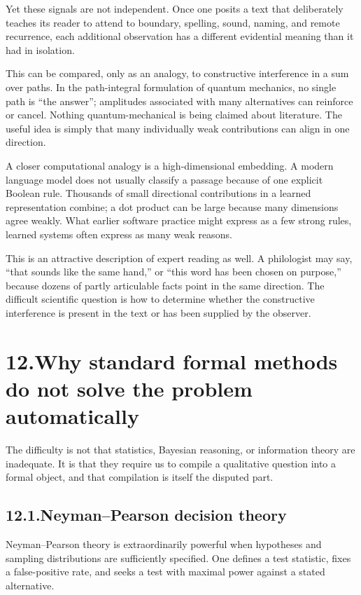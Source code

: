 Yet these signals are not independent.  Once one posits a text that deliberately teaches its reader to attend to boundary, spelling, sound, naming, and remote recurrence, each additional observation has a different evidential meaning than it had in isolation.

This can be compared, only as an analogy, to constructive interference in a sum over paths.  In the path-integral formulation of quantum mechanics, no single path is ``the answer''; amplitudes associated with many alternatives can reinforce or cancel.\cite{FeynmanHibbs1965}  Nothing quantum-mechanical is being claimed about literature.  The useful idea is simply that many individually weak contributions can align in one direction.

A closer computational analogy is a high-dimensional embedding.  A modern language model does not usually classify a passage because of one explicit Boolean rule.  Thousands of small directional contributions in a learned representation combine; a dot product can be large because many dimensions agree weakly.  What earlier software practice might express as a few strong rules, learned systems often express as many weak reasons.

This is an attractive description of expert reading as well.  A philologist may say, ``that sounds like the same hand,'' or ``this word has been chosen on purpose,'' because dozens of partly articulable facts point in the same direction.  The difficult scientific question is how to determine whether the constructive interference is present in the text or has been supplied by the observer.

\section*{12.\quad Why standard formal methods do not solve the problem automatically}

The difficulty is not that statistics, Bayesian reasoning, or information theory are inadequate.  It is that they require us to compile a qualitative question into a formal object, and that compilation is itself the disputed part.

\subsection*{12.1.\quad Neyman--Pearson decision theory}

Neyman--Pearson theory is extraordinarily powerful when hypotheses and sampling distributions are sufficiently specified.  One defines a test statistic, fixes a false-positive rate, and seeks a test with maximal power against a stated alternative.\cite{NeymanPearson1933}

